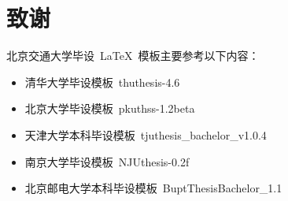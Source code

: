 \chapter*{致谢}
北京交通大学毕设~\LaTeX{}~模板主要参考以下内容：
\begin{itemize}
  \item 清华大学毕设模板~thuthesis-4.6~
  \item 北京大学毕设模板~pkuthss-1.2beta~
  \item 天津大学本科毕设模板~tjuthesis\_bachelor\_v1.0.4~
  \item 南京大学毕设模板~NJUthesis-0.2f~
  \item 北京邮电大学本科毕设模板~BuptThesisBachelor\_1.1~
\end{itemize}
